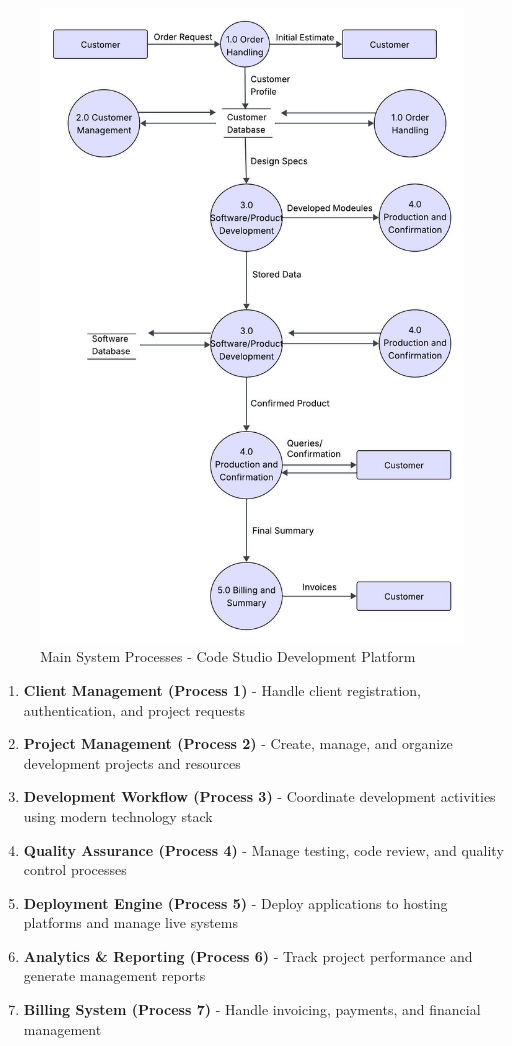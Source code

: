 \documentclass[12pt,a4paper]{article}
\begin{document}
\begin{figure}[H]
  \centering
  \includegraphics[width=0.9\linewidth]{"Thought web weaver (2).jpeg"}
  \caption{Main System Processes - Code Studio Development Platform}
\end{figure}

\newpage
\begin{enumerate}
\item \textbf{Client Management (Process 1)} - Handle client registration, authentication, and project requests
\item \textbf{Project Management (Process 2)} - Create, manage, and organize development projects and resources
\item \textbf{Development Workflow (Process 3)} - Coordinate development activities using modern technology stack
\item \textbf{Quality Assurance (Process 4)} - Manage testing, code review, and quality control processes
\item \textbf{Deployment Engine (Process 5)} - Deploy applications to hosting platforms and manage live systems
\item \textbf{Analytics \& Reporting (Process 6)} - Track project performance and generate management reports
\item \textbf{Billing System (Process 7)} - Handle invoicing, payments, and financial management
\end{enumerate}
\end{document}
